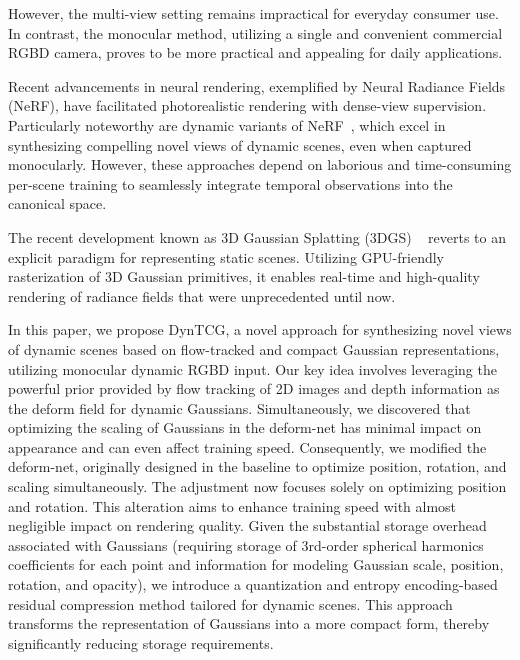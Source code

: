 However, the multi-view setting remains impractical for everyday consumer use. In contrast, the monocular method, utilizing a single and convenient commercial RGBD camera, proves to be more practical and appealing for daily applications.

Recent advancements in neural rendering, exemplified by Neural Radiance Fields (NeRF)\cite{mildenhall2020nerf}, have facilitated photorealistic rendering with dense-view supervision. Particularly noteworthy are dynamic variants of NeRF~\cite{gao2021dynamic}, which excel in synthesizing compelling novel views of dynamic scenes, even when captured monocularly. However, these approaches depend on laborious and time-consuming per-scene training to seamlessly integrate temporal observations into the canonical space.

The recent development known as 3D Gaussian Splatting (3DGS) 
~\cite{kerbl3Dgaussians} reverts to an explicit paradigm for representing static scenes. Utilizing GPU-friendly rasterization of 3D Gaussian primitives, it enables real-time and high-quality rendering of radiance fields that were unprecedented until now.

In this paper, we propose DynTCG, a novel approach for synthesizing novel views of dynamic scenes based on flow-tracked and compact Gaussian representations, utilizing monocular dynamic RGBD input. Our key idea involves leveraging the powerful prior provided by flow tracking of 2D images and depth information as the deform field for dynamic Gaussians. Simultaneously, we discovered that optimizing the scaling of Gaussians in the deform-net has minimal impact on appearance and can even affect training speed. Consequently, we modified the deform-net, originally designed in the baseline to optimize position, rotation, and scaling simultaneously. The adjustment now focuses solely on optimizing position and rotation. This alteration aims to enhance training speed with almost negligible impact on rendering quality. Given the substantial storage overhead associated with Gaussians (requiring storage of 3rd-order spherical harmonics coefficients for each point and information for modeling Gaussian scale, position, rotation, and opacity), we introduce a quantization and entropy encoding-based residual compression method tailored for dynamic scenes. This approach transforms the representation of Gaussians into a more compact form, thereby significantly reducing storage requirements.





